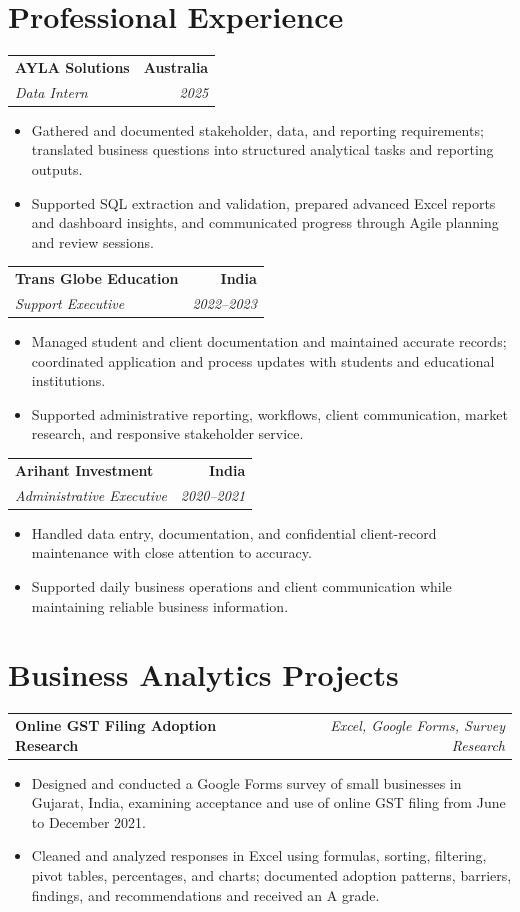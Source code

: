 \documentclass[letterpaper,10pt]{article}
\makeatletter
\newcommand{\role}[4]{%
  \begin{tabularx}{\textwidth}{@{}Xr@{}}
    \textbf{#1} & \textbf{#2} \\
    \textit{#3} & \textit{#4}
  \end{tabularx}\vspace{-1pt}
}
\newcommand{\project}[2]{%
  \begin{tabularx}{\textwidth}{@{}Xr@{}}
    \textbf{#1} & \textit{#2}
  \end{tabularx}\vspace{-1pt}
}
\makeatother
\begin{document}
\section{Professional Experience}
\role{AYLA Solutions}{Australia}{Data Intern}{2025}
\begin{itemize}
  \item Gathered and documented stakeholder, data, and reporting requirements; translated business questions into structured analytical tasks and reporting outputs.
  \item Supported SQL extraction and validation, prepared advanced Excel reports and dashboard insights, and communicated progress through Agile planning and review sessions.
\end{itemize}
\vspace{1pt}

\role{Trans Globe Education}{India}{Support Executive}{2022--2023}
\begin{itemize}
  \item Managed student and client documentation and maintained accurate records; coordinated application and process updates with students and educational institutions.
  \item Supported administrative reporting, workflows, client communication, market research, and responsive stakeholder service.
\end{itemize}
\vspace{1pt}

\role{Arihant Investment}{India}{Administrative Executive}{2020--2021}
\begin{itemize}
  \item Handled data entry, documentation, and confidential client-record maintenance with close attention to accuracy.
  \item Supported daily business operations and client communication while maintaining reliable business information.
\end{itemize}

\section{Business Analytics Projects}
\project{Online GST Filing Adoption Research}{Excel, Google Forms, Survey Research}
\begin{itemize}
  \item Designed and conducted a Google Forms survey of small businesses in Gujarat, India, examining acceptance and use of online GST filing from June to December 2021.
  \item Cleaned and analyzed responses in Excel using formulas, sorting, filtering, pivot tables, percentages, and charts; documented adoption patterns, barriers, findings, and recommendations and received an A grade.
\end{itemize}
\vspace{1pt}
\end{document}
